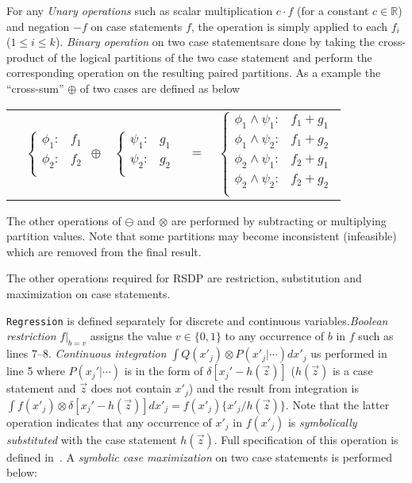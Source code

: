For any \emph{Unary operations} such as scalar multiplication $c\cdot f$ (for
a constant $c \in \mathbb{R}$) and negation $-f$ on case statements
$f$, the operation is simply applied to each
$f_i$ ($1 \leq i \leq k$). \emph{Binary operation} on two case statementsare done by taking the cross-product
of the logical partitions of the two case statement and perform the
corresponding operation on the resulting paired partitions.  As a  example the ``cross-sum'' $\oplus$ of two cases are defined as below

{\footnotesize 
\begin{center}
\begin{tabular}{r c c c l}
&
\hspace{-6mm} 
  $\begin{cases}
    \phi_1: & f_1 \\ 
    \phi_2: & f_2 \\ 
  \end{cases}$
$\oplus$
&
\hspace{-4mm}
  $\begin{cases}
    \psi_1: & g_1 \\ 
    \psi_2: & g_2 \\ 
  \end{cases}$
&
\hspace{-2mm} 
$ = $
&
\hspace{-2mm}
  $\begin{cases}
  \phi_1 \wedge \psi_1: & f_1 + g_1 \\ 
  \phi_1 \wedge \psi_2: & f_1 + g_2 \\ 
  \phi_2 \wedge \psi_1: & f_2 + g_1 \\ 
  \phi_2 \wedge \psi_2: & f_2 + g_2 \\ 
  \end{cases}$
\end{tabular}
\end{center}
}
\normalsize

The other operations of $\ominus$ and $\otimes$ are performed by subtracting or multiplying partition values.  Note that some partitions may become inconsistent (infeasible)  which are removed from the final result. 

The other operations required for RSDP are restriction, substitution and maximization on case statements.  

\texttt{Regression} is defined separately for discrete and continuous variables.\emph{Boolean restriction} $f|_{b=v}$ assigns the value $v \in \{ 0,1 \}$ to any occurrence of $b$ in $f$ such as lines 7--8. \emph{Continuous integration} $\int Q(x'_j) \otimes P(x'_j|\cdots) dx'_j$  us performed in line 5 where $P(x_j'|\cdots)$
is in the form of $\delta[x_j' - h(\vec{z})]$ ($h(\vec{z})$ is a case statement and $\vec{z}$ does not contain
$x'_j$) and the result from integration is $\int f(x'_j) \otimes \delta[x_j' - h(\vec{z})] dx'_j = f(x'_j) \{ x'_j / h(\vec{z}) \}$. Note that the latter operation indicates that any occurrence of $x'_j$ in
$f(x'_j)$ is \emph{symbolically substituted} with the case statement
$h(\vec{z})$.  Full specification of this operation is defined in~\cite{sanner_uai11}. 
A \emph{symbolic case maximization} on two case statements is performed below:
\vspace{-4mm}

